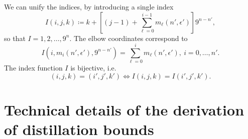We can unify the indices, by introducing a single index
\begin{equation}
    I(i,j,k) \coloneqq k + \left[ (j-1) + \sum_{\ell=0}^{i-1} m_{\ell}(n', \epsilon') \right]9^{n-n'},
\end{equation}
so that $I=1,2,\dots, 9^{n}$.
The elbow coordinates correspond to 
\begin{equation}
	I(i, m_{i}(n', \epsilon'), 9^{n-n'}) = \sum_{\ell=0}^{i} m_{\ell}(n', \epsilon'),\ i= 0,\dots,n'.
\end{equation}
The index function $I$ is bijective, i.e.
\begin{equation}
	(i,j,k) = (i',j',k') \Leftrightarrow I(i,j,k) = I(i',j',k').
\end{equation}


\section{Technical details of the derivation of distillation bounds}
\label{app:lcst_technical}

